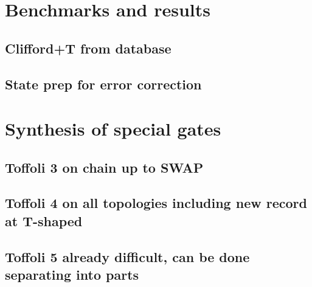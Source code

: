 \documentclass[amsfonts, amssymb, aps, nofootinbib]{revtex4-2}
\begin{document}
\section{Benchmarks and results}
\subsection{Clifford+T from database}
\subsection{State prep for error correction}
\section{Synthesis of special gates}
\subsection{Toffoli 3 on chain up to SWAP}
\subsection{Toffoli 4 on all topologies including new record at T-shaped}
\subsection{Toffoli 5 already difficult, can be done separating into parts}


\end{document}
